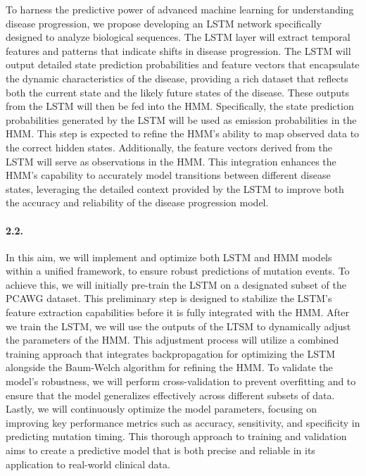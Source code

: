To harness the predictive power of advanced machine learning for understanding disease progression, 
we propose developing an LSTM network specifically designed to analyze biological sequences. 
The LSTM layer will extract temporal features and patterns that indicate shifts in disease progression. 
The LSTM will output detailed state prediction probabilities and feature vectors that 
encapsulate the dynamic characteristics of the disease, 
providing a rich dataset that reflects both the current state and the likely future states of the disease. 
These outputs from the LSTM will then be fed into the HMM. 
Specifically, the state prediction probabilities generated by the LSTM will be used as emission probabilities in the HMM. 
This step is expected to refine the HMM's ability to map observed data to the correct hidden states. 
Additionally, the feature vectors derived from the LSTM will serve as observations in the HMM. 
This integration enhances the HMM’s capability to accurately model transitions between different disease states, 
leveraging the detailed context provided by the LSTM to improve both the accuracy and reliability of the disease progression model.

\paragraph{2.2. \SpecificAimTwoB}

In this aim, we will implement and optimize both LSTM and HMM models within a unified framework, 
to ensure robust predictions of mutation events. 
To achieve this, we will initially pre-train the LSTM on a designated subset of the PCAWG dataset. 
This preliminary step is designed to stabilize the LSTM's feature extraction capabilities before it is fully integrated with the HMM. 
After we train the LSTM, we will use the outputs of the LTSM to dynamically adjust the parameters of the HMM. 
This adjustment process will utilize a combined training approach that integrates backpropagation for optimizing 
the LSTM alongside the Baum-Welch algorithm for refining the HMM. 
To validate the model's robustness, we will perform cross-validation to prevent overfitting 
and to ensure that the model generalizes effectively across different subsets of data. 
Lastly, we will continuously optimize the model parameters, focusing on improving key performance metrics such as 
accuracy, sensitivity, and specificity in predicting mutation timing. 
This thorough approach to training and validation aims to create a predictive model that is both precise and reliable in its application to real-world clinical data.

